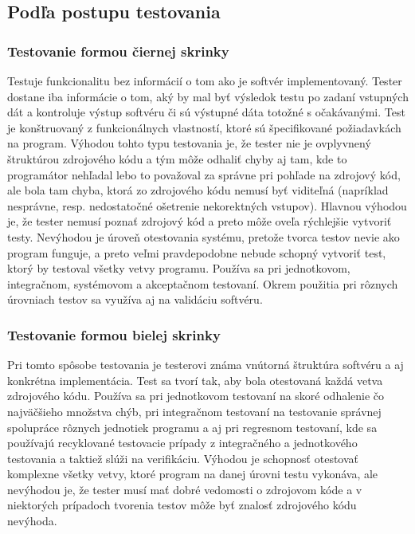 \documentclass[11pt,twoside,slovak,a4paper]{article}
\begin{document}
	\subsection{Podľa postupu testovania}
		\subsubsection{Testovanie formou čiernej skrinky} 
			Testuje funkcionalitu bez informácií o tom ako je softvér implementovaný. Tester dostane iba informácie o tom, aký by mal byť výsledok testu po zadaní vstupných dát a kontroluje výstup softvéru či sú výstupné dáta totožné s očakávanými\cite{EST2002}. Test je konštruovaný z funkcionálnych vlastností, ktoré sú špecifikované požiadavkách na program\cite{Moha1991}.  Výhodou tohto typu testovania je, že tester nie je ovplyvnený štruktúrou zdrojového kódu a tým môže odhaliť chyby aj tam, kde to programátor nehľadal lebo to považoval za správne pri pohľade na zdrojový kód, ale bola tam chyba, ktorá zo zdrojového kódu nemusí byť viditeľná (napríklad nesprávne, resp. nedostatočné ošetrenie nekorektných vstupov). Hlavnou výhodou je, že tester nemusí poznať zdrojový kód a preto môže oveľa rýchlejšie vytvoriť testy. Nevýhodou je úroveň otestovania systému, pretože tvorca testov nevie ako program funguje, a preto veľmi pravdepodobne nebude schopný vytvoriť test, ktorý by testoval všetky vetvy programu. Používa sa pri jednotkovom, integračnom, systémovom a akceptačnom testovaní. Okrem použitia pri rôznych úrovniach testov sa využíva aj na validáciu softvéru\cite{EST2002}.
		\subsubsection{Testovanie formou bielej skrinky} 
			Pri tomto spôsobe testovania je testerovi známa vnútorná štruktúra softvéru a aj konkrétna implementácia. Test sa tvorí tak, aby bola otestovaná každá vetva zdrojového kódu\cite{EST2002}. Používa sa pri jednotkovom testovaní na skoré odhalenie čo najväčšieho množstva chýb, pri integračnom testovaní na testovanie správnej spolupráce rôznych jednotiek programu a aj pri regresnom testovaní, kde sa používajú recyklované testovacie prípady z integračného a jednotkového testovania a taktiež slúži na verifikáciu. Výhodou je schopnosť otestovať komplexne všetky vetvy, ktoré program na danej úrovni testu vykonáva, ale nevýhodou je, že tester musí mať dobré vedomosti o zdrojovom kóde a v niektorých prípadoch tvorenia testov môže byť znalosť zdrojového kódu nevýhoda.
\end{document}

